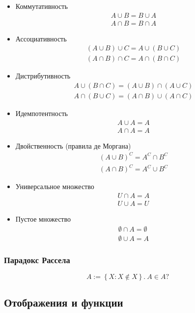 \begin{itemize}
    \item Коммутативность
    \begin{align*}
        A \cup B = B \cup A \\
        A \cap B = B \cap A
    \end{align*}
    \item Ассоциативность
    \begin{align*}
        (A \cup B) \cup C = A \cup (B \cup C) \\
        (A \cap B) \cap C = A \cap (B \cap C)
    \end{align*}
    \item Дистрибутивность
    \begin{align*}
        A \cup (B \cap C) = (A \cup B) \cap (A \cup C) \\
        A \cap (B \cup C) = (A \cap B) \cup (A \cap C)
    \end{align*}
    \item Идемпотентность
    \begin{align*}
        A \cup A = A \\
        A \cap A = A
    \end{align*}
    \item Двойственность (правила де Моргана)
    \begin{align*}
        (A \cup B)^C = A^C \cap B^C \\
        (A \cap B)^C = A^C \cup B^C
    \end{align*}
    \item Универсальное множество
    \begin{align*}
        U \cap A = A \\
        U \cup A = U
    \end{align*}
    \item Пустое множество
    \begin{align*}
        \emptyset \cap A = \emptyset \\
        \emptyset \cup A = A
    \end{align*}
\end{itemize}

\subsubsection*{Парадокс Рассела}

\[A := \left\{X : X \notin X\right\}.\  A \in A ?\]

\subsection{Отображения и функции}

